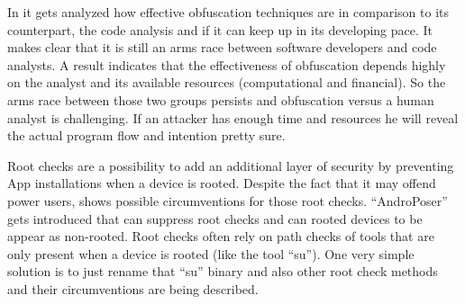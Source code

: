 In \parencite{obfucsation_vs_code_analysis} it gets analyzed how effective obfuscation
techniques are in comparison to its counterpart, the code analysis and if it can
keep up in its developing pace. It makes clear that it is still an arms race between
software developers and code analysts. A result indicates that the effectiveness of
obfuscation depends highly on the analyst and its available resources (computational and
financial). So the arms race between those two groups persists and obfuscation versus
a human analyst is challenging. If an attacker has enough time and resources he will
reveal the actual program flow and intention pretty sure.

Root checks are a possibility to add an additional layer of security by preventing App installations when a device is rooted. Despite the fact that it may offend power users,
\parencite{root_checks} shows possible circumventions for those root checks. ``AndroPoser'' gets introduced that can suppress root checks and can rooted devices to be appear as
non-rooted. Root checks often rely on path checks of tools that are only present when a device is rooted (like the tool ``su''). One very simple solution is to just rename that ``su'' binary and also other root check methods and their circumventions are being described.










